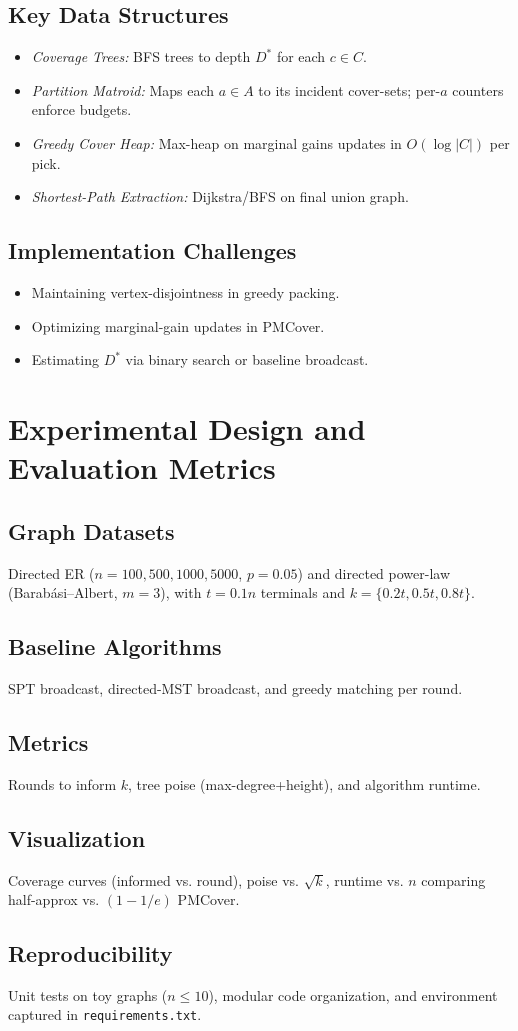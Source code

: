 \documentclass[12pt]{article}
\begin{document}
\subsection{Key Data Structures}
\begin{itemize}
  \item \emph{Coverage Trees:} BFS trees to depth $D^*$ for each $c\in C$.  
  \item \emph{Partition Matroid:} Maps each $a\in A$ to its incident cover-sets; per-$a$ counters enforce budgets.
  \item \emph{Greedy Cover Heap:} Max-heap on marginal gains updates in $O(\log|C|)$ per pick.
  \item \emph{Shortest-Path Extraction:} Dijkstra/BFS on final union graph.
\end{itemize}

\subsection{Implementation Challenges}
\begin{itemize}
  \item Maintaining vertex-disjointness in greedy packing.  
  \item Optimizing marginal-gain updates in PMCover.  
  \item Estimating $D^*$ via binary search or baseline broadcast.
\end{itemize}

\section{Experimental Design and Evaluation Metrics}
\subsection{Graph Datasets}
Directed ER ($n=100,500,1000,5000$, $p=0.05$) and directed power-law (Barabási–Albert, $m=3$), with $t=0.1n$ terminals and $k=\{0.2t,0.5t,0.8t\}$.

\subsection{Baseline Algorithms}
SPT broadcast, directed-MST broadcast, and greedy matching per round.

\subsection{Metrics}
Rounds to inform $k$, tree poise (max-degree+height), and algorithm runtime.

\subsection{Visualization}
Coverage curves (informed vs. round), poise vs. $\sqrt{k}$, runtime vs. $n$ comparing half-approx vs. $(1-1/e)$ PMCover.

\subsection{Reproducibility}
Unit tests on toy graphs ($n\le10$), modular code organization, and environment captured in \texttt{requirements.txt}.
\end{document}
